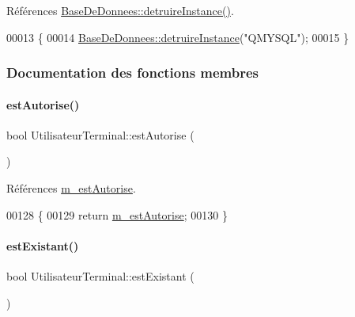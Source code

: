 Références \hyperlink{class_base_de_donnees_a457401c0816b888c77ce915997545f4e}{Base\+De\+Donnees\+::detruire\+Instance()}.


\begin{DoxyCode}
00013 \{
00014     \hyperlink{class_base_de_donnees_a457401c0816b888c77ce915997545f4e}{BaseDeDonnees::detruireInstance}(\textcolor{stringliteral}{"QMYSQL"});
00015 \}
\end{DoxyCode}


\subsubsection{Documentation des fonctions membres}
\mbox{\label{class_utilisateur_terminal_a6cd16c268f5ab545fc2b62f1e29a9917}} 
\paragraph{\texorpdfstring{est\+Autorise()}{estAutorise()}}
{\footnotesize\ttfamily bool Utilisateur\+Terminal\+::est\+Autorise (\begin{DoxyParamCaption}{ }\end{DoxyParamCaption})}



Références \hyperlink{class_utilisateur_terminal_a79d15bdf8428eb1a131ce4801ac619aa}{m\+\_\+est\+Autorise}.


\begin{DoxyCode}
00128 \{
00129     \textcolor{keywordflow}{return} \hyperlink{class_utilisateur_terminal_a79d15bdf8428eb1a131ce4801ac619aa}{m\_estAutorise};
00130 \}
\end{DoxyCode}
\mbox{\label{class_utilisateur_terminal_aa80e532db6a898bf1aa433ffb34f2389}} 
\paragraph{\texorpdfstring{est\+Existant()}{estExistant()}}
{\footnotesize\ttfamily bool Utilisateur\+Terminal\+::est\+Existant (\begin{DoxyParamCaption}{ }\end{DoxyParamCaption})}




